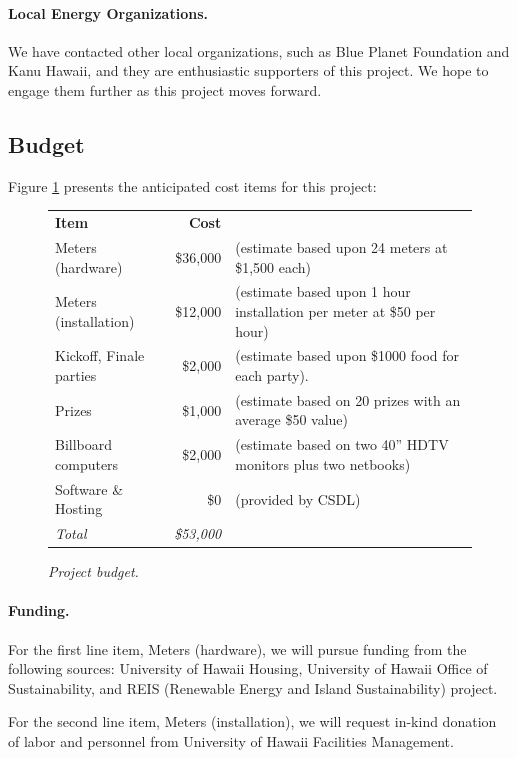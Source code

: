 \documentclass[11pt]{article}
\begin{document}
\paragraph{Local Energy Organizations.}  We have contacted other local
organizations, such as Blue Planet Foundation and Kanu Hawaii, and they are
enthusiastic supporters of this project.  We hope to engage them further as
this project moves forward.


\subsection{Budget}
\label{sec:budget}

Figure \ref{fig:budget} presents the anticipated cost items for this project:

\begin{figure}[!ht]
\small
\begin{tabular}{lrl} \hline
{\bf Item }              & {\bf Cost }  & \\ 
Meters (hardware)      & \$36,000 & (estimate based upon 24 meters at \$1,500 each) \\
Meters (installation)    & \$12,000 & (estimate based upon 1 hour installation per meter at \$50 per hour) \\
Kickoff, Finale parties & \$2,000 & (estimate based upon \$1000 food for each party). \\ 
Prizes                          & \$1,000  & (estimate based on 20 prizes with an average \$50 value) \\ 
Billboard computers  & \$2,000 & (estimate based on two 40'' HDTV monitors plus two netbooks) \\
Software  \& Hosting  & \$0 & (provided by CSDL) \\ \hline
{\em Total}                 &  {\em \$53,000} & \\ \hline      
\end{tabular} 
\normalsize
\caption{{\em Project budget.}}
\label{fig:budget}
\end{figure}

\paragraph{Funding.}  For the first line item, Meters (hardware), we will
pursue funding from the following sources: University of Hawaii Housing,
University of Hawaii Office of Sustainability, and REIS (Renewable Energy
and Island Sustainability) project.

For the second line item, Meters (installation), we will request in-kind donation 
of labor and personnel from  University of Hawaii Facilities Management.
\end{document}
